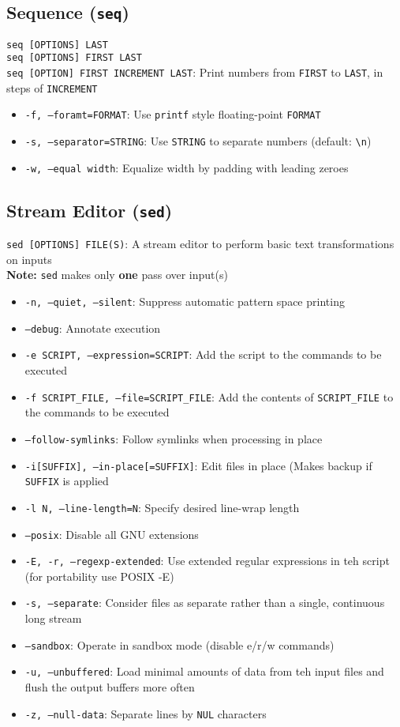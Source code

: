 \documentclass[13pt]{article}
\begin{document}
\subsection{Sequence (\texttt{seq})}
\texttt{seq [OPTIONS] LAST} \\
\texttt{seq [OPTIONS] FIRST LAST} \\
\texttt{seq [OPTION] FIRST INCREMENT LAST}: Print numbers from \texttt{FIRST} to \texttt{LAST}, in steps of \texttt{INCREMENT}
\begin{itemize}[leftmargin = 0pt]
\item [] \texttt{-f, --foramt=FORMAT}: Use \texttt{printf} style floating-point \texttt{FORMAT}
\item [] \texttt{-s, --separator=STRING}: Use \texttt{STRING} to separate numbers (default: \texttt{\textbackslash n})
\item [] \texttt{-w, --equal width}: Equalize width by padding with leading zeroes
\end{itemize}

\subsection{Stream Editor (\texttt{sed})}
\texttt{sed [OPTIONS] FILE(S)}: A stream editor to perform basic text transformations on inputs \\
\textbf{Note:} \texttt{sed} makes only \textbf{one} pass over input(s)
\begin{itemize}[leftmargin = 0pt]
\item [] \texttt{-n, --quiet, --silent}: Suppress automatic pattern space printing
\item [] \texttt{--debug}: Annotate execution
\item [] \texttt{-e SCRIPT, --expression=SCRIPT}: Add the script to the commands to be executed
\item [] \texttt{-f SCRIPT\_FILE, --file=SCRIPT\_FILE}: Add the contents of \texttt{SCRIPT\_FILE} to the commands to be executed
\item [] \texttt{--follow-symlinks}: Follow symlinks when processing in place
\item [] \texttt{-i[SUFFIX], --in-place[=SUFFIX]}: Edit files in place (Makes backup if \texttt{SUFFIX} is applied
\item [] \texttt{-l N, --line-length=N}: Specify desired line-wrap length
\item [] \texttt{--posix}: Disable all GNU extensions
\item [] \texttt{-E, -r, --regexp-extended}: Use extended regular expressions in teh script (for portability use POSIX -E)
\item [] \texttt{-s, --separate}: Consider files as separate rather than a single, continuous long stream
\item [] \texttt{--sandbox}: Operate in sandbox mode (disable e/r/w commands)
\item [] \texttt{-u, --unbuffered}: Load minimal amounts of data from teh input files and flush the output buffers more often
\item [] \texttt{-z, --null-data}: Separate lines by \texttt{NUL} characters
\end{itemize}
\end{document}
